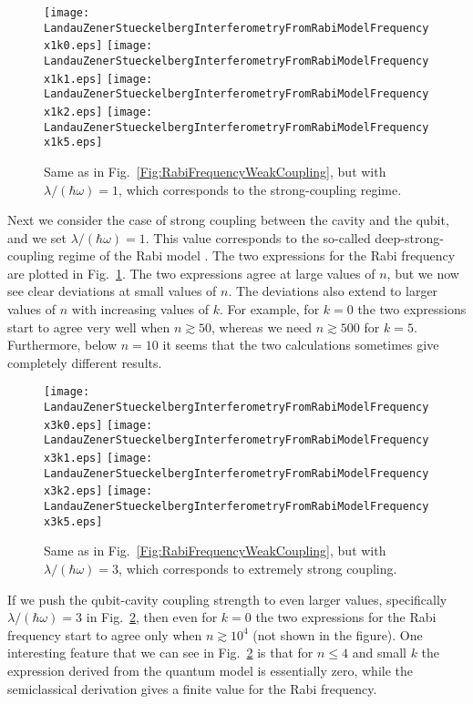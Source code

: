 \documentclass[aps,twocolumn,superscriptaddress]{revtex4}
\begin{document}
\begin{figure}[h]
\texttt{[image: LandauZenerStueckelbergInterferometryFromRabiModelFrequencyx1k0.eps]}
\texttt{[image: LandauZenerStueckelbergInterferometryFromRabiModelFrequencyx1k1.eps]}
\texttt{[image: LandauZenerStueckelbergInterferometryFromRabiModelFrequencyx1k2.eps]}
\texttt{[image: LandauZenerStueckelbergInterferometryFromRabiModelFrequencyx1k5.eps]}
\caption{Same as in Fig.~\ref{Fig:RabiFrequencyWeakCoupling}, but with $\lambda/(\hbar\omega)=1$, which corresponds to the strong-coupling regime.}
%
\label{Fig:RabiFrequencyIntermediateCoupling}
\end{figure}

Next we consider the case of strong coupling between the cavity and the qubit, and we set $\lambda/(\hbar\omega)=1$. This value corresponds to the so-called deep-strong-coupling regime of the Rabi model \cite{Casanova,Wolf,Yoshihara,YoshiharaSpectra,Ashhab2010}. The two expressions for the Rabi frequency are plotted in Fig.~\ref{Fig:RabiFrequencyIntermediateCoupling}. The two expressions agree at large values of $n$, but we now see clear deviations at small values of $n$. The deviations also extend to larger values of $n$ with increasing values of $k$. For example, for $k=0$ the two expressions start to agree very well when $n\gtrsim 50$, whereas we need $n\gtrsim 500$ for $k=5$. Furthermore, below $n=10$ it seems that the two calculations sometimes give completely different results.

\begin{figure}[h]
\texttt{[image: LandauZenerStueckelbergInterferometryFromRabiModelFrequencyx3k0.eps]}
\texttt{[image: LandauZenerStueckelbergInterferometryFromRabiModelFrequencyx3k1.eps]}
\texttt{[image: LandauZenerStueckelbergInterferometryFromRabiModelFrequencyx3k2.eps]}
\texttt{[image: LandauZenerStueckelbergInterferometryFromRabiModelFrequencyx3k5.eps]}
\caption{Same as in Fig.~\ref{Fig:RabiFrequencyWeakCoupling}, but with $\lambda/(\hbar\omega)=3$, which corresponds to extremely strong coupling.}
%
\label{Fig:RabiFrequencyStrongCoupling}
\end{figure}

If we push the qubit-cavity coupling strength to even larger values, specifically $\lambda/(\hbar\omega)=3$ in Fig.~\ref{Fig:RabiFrequencyStrongCoupling}, then even for $k=0$ the two expressions for the Rabi frequency start to agree only when $n\gtrsim 10^4$ (not shown in the figure). One interesting feature that we can see in Fig.~\ref{Fig:RabiFrequencyStrongCoupling} is that for $n\leq 4$ and small $k$ the expression derived from the quantum model is essentially zero, while the semiclassical derivation gives a finite value for the Rabi frequency.
\end{document}
